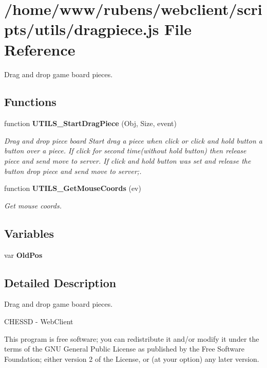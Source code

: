 \section{/home/www/rubens/webclient/scripts/utils/dragpiece.js File Reference}
\label{dragpiece_8js}
Drag and drop game board pieces. 

\subsection*{Functions}
\begin{CompactItemize}
\item 
function {\bf UTILS\_\-StartDragPiece} (Obj, Size, event)
\begin{CompactList}\small\item\em Drag and drop piece board Start drag a piece when click or click and hold button a button over a piece. If click for second time(without hold button) then release piece and send move to server. If click and hold button was set and release the button drop piece and send move to server;. \item\end{CompactList}\item 
function {\bf UTILS\_\-GetMouseCoords} (ev)
\begin{CompactList}\small\item\em Get mouse coords. \item\end{CompactList}\end{CompactItemize}
\subsection*{Variables}
\begin{CompactItemize}
\item 
var {\bf OldPos}
\end{CompactItemize}


\subsection{Detailed Description}
Drag and drop game board pieces. 

CHESSD - WebClient

This program is free software; you can redistribute it and/or modify it under the terms of the GNU General Public License as published by the Free Software Foundation; either version 2 of the License, or (at your option) any later version.

